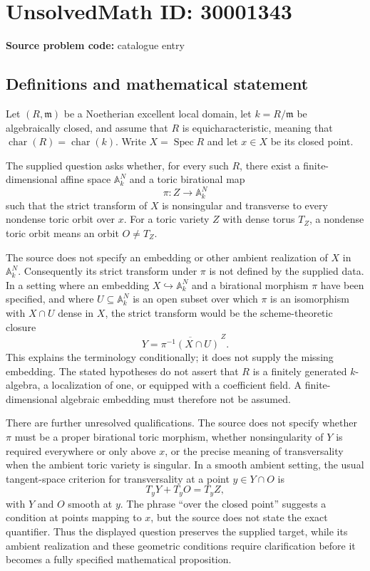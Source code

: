 \documentclass[11pt]{article}
\begin{document}
\section*{UnsolvedMath ID: 30001343}
\textbf{Source problem code:} catalogue entry
\subsection{Definitions and mathematical statement}
Let \((R,\mathfrak m)\) be a Noetherian excellent local domain, let \(k=R/\mathfrak m\) be algebraically closed, and assume that \(R\) is equicharacteristic, meaning that \(\operatorname{char}(R)=\operatorname{char}(k)\). Write \(X=\operatorname{Spec}R\) and let \(x\in X\) be its closed point.

The supplied question asks whether, for every such \(R\), there exist a finite-dimensional affine space \(\mathbb A_k^N\) and a toric birational map
\[
\pi:Z\longrightarrow\mathbb A_k^N
\]
such that the strict transform of \(X\) is nonsingular and transverse to every nondense toric orbit over \(x\). For a toric variety \(Z\) with dense torus \(T_Z\), a nondense toric orbit means an orbit \(O\ne T_Z\).

The source does not specify an embedding or other ambient realization of \(X\) in \(\mathbb A_k^N\). Consequently its strict transform under \(\pi\) is not defined by the supplied data. In a setting where an embedding \(X\hookrightarrow\mathbb A_k^N\) and a birational morphism \(\pi\) have been specified, and where \(U\subseteq\mathbb A_k^N\) is an open subset over which \(\pi\) is an isomorphism with \(X\cap U\) dense in \(X\), the strict transform would be the scheme-theoretic closure
\[
Y=\overline{\pi^{-1}(X\cap U)}^{\,Z}.
\]
This explains the terminology conditionally; it does not supply the missing embedding. The stated hypotheses do not assert that \(R\) is a finitely generated \(k\)-algebra, a localization of one, or equipped with a coefficient field. A finite-dimensional algebraic embedding must therefore not be assumed.

There are further unresolved qualifications. The source does not specify whether \(\pi\) must be a proper birational toric morphism, whether nonsingularity of \(Y\) is required everywhere or only above \(x\), or the precise meaning of transversality when the ambient toric variety is singular. In a smooth ambient setting, the usual tangent-space criterion for transversality at a point \(y\in Y\cap O\) is
\[
T_yY+T_yO=T_yZ,
\]
with \(Y\) and \(O\) smooth at \(y\). The phrase ``over the closed point'' suggests a condition at points mapping to \(x\), but the source does not state the exact quantifier. Thus the displayed question preserves the supplied target, while its ambient realization and these geometric conditions require clarification before it becomes a fully specified mathematical proposition.
\end{document}
